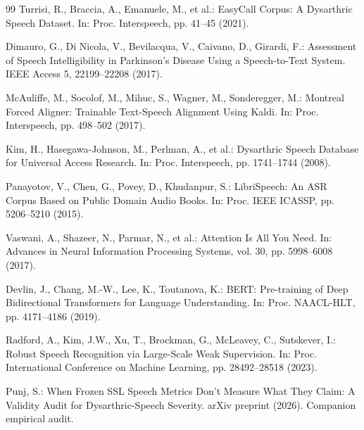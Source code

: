 \documentclass[runningheads]{llncs}
\begin{document}
\begin{thebibliography}{99}
Turrisi, R., Braccia, A., Emanuele, M., et al.: EasyCall Corpus: A Dysarthric Speech
Dataset. In: Proc. Interspeech, pp. 41--45 (2021).

Dimauro, G., Di Nicola, V., Bevilacqua, V., Caivano, D., Girardi, F.: Assessment of Speech
Intelligibility in Parkinson's Disease Using a Speech-to-Text System. IEEE Access 5,
22199--22208 (2017).

McAuliffe, M., Socolof, M., Mihuc, S., Wagner, M., Sonderegger, M.: Montreal Forced Aligner:
Trainable Text-Speech Alignment Using Kaldi. In: Proc. Interspeech, pp. 498--502 (2017).

Kim, H., Hasegawa-Johnson, M., Perlman, A., et al.: Dysarthric Speech Database for
Universal Access Research. In: Proc. Interspeech, pp. 1741--1744 (2008).

Panayotov, V., Chen, G., Povey, D., Khudanpur, S.: LibriSpeech: An ASR Corpus Based on
Public Domain Audio Books. In: Proc. IEEE ICASSP, pp. 5206--5210 (2015).

Vaswani, A., Shazeer, N., Parmar, N., et al.: Attention Is All You Need. In: Advances in
Neural Information Processing Systems, vol. 30, pp. 5998--6008 (2017).

Devlin, J., Chang, M.-W., Lee, K., Toutanova, K.: BERT: Pre-training of Deep Bidirectional
Transformers for Language Understanding. In: Proc. NAACL-HLT, pp. 4171--4186 (2019).

Radford, A., Kim, J.W., Xu, T., Brockman, G., McLeavey, C., Sutskever, I.: Robust Speech
Recognition via Large-Scale Weak Supervision. In: Proc. International Conference on Machine
Learning, pp. 28492--28518 (2023).

Punj, S.: When Frozen SSL Speech Metrics Don't Measure What They Claim: A Validity Audit
for Dysarthric-Speech Severity. arXiv preprint (2026). Companion empirical audit.

\end{thebibliography}
\end{document}
